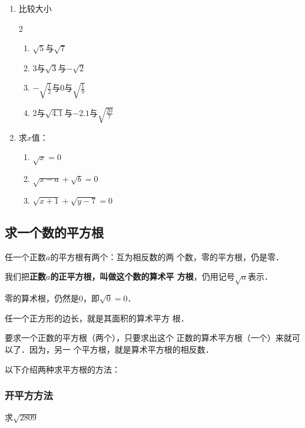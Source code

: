 \begin{ex}
\begin{enumerate}
    \item 比较大小
    \begin{multicols}{2}
\begin{enumerate}
    \item $\sqrt{5}$与$\sqrt{7}$
    \item 3与$\sqrt{3}$与$-\sqrt{2}$
    \item $-\sqrt{\frac{1}{2}}$与0与$\sqrt{\frac{1}{9}}$
    \item 2与$\sqrt{4.1}$与$-2.1$与$\sqrt{\frac{20}{7}}$
\end{enumerate}
    \end{multicols}

    \item 求$x$值：
\begin{enumerate}
    \item $\sqrt{x}=0$
    \item $\sqrt{x-a}+\sqrt{b}=0$
    \item $\sqrt{x+1}+\sqrt{y-7}=0$
\end{enumerate}
\end{enumerate}
    
\end{ex}

\subsection{求一个数的平方根}
任一个正数$a$的平方根有两个：互为相反数的两
个数，零的平方根，仍是零．

我们把\textbf{正数$a$的正平方根，叫做这个数的算术平
方根}，仍用记号$\sqrt{a}$表示．

零的算术根，仍然是0，即$\sqrt{0}=0$．

任一个正方形的边长，就是其面积的算术平方
根．

要求一个正数的平方根（两个），只要求出这个
正数的算术平方根（一个）来就可以了．因为，另一
个平方根，就是算术平方根的相反数．

以下介绍两种求平方根的方法：

\subsubsection{开平方方法}
\begin{example}
    求$\sqrt{2809}$
\end{example}

